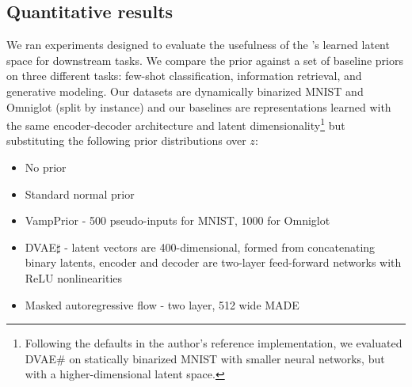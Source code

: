 \subsection{Quantitative results}

We ran experiments designed to
evaluate the usefulness of the \acronym's
learned latent space for downstream tasks. We 
compare the \acronym\;prior
against a set of baseline priors
on three different tasks:
few-shot classification,
information retrieval,
and generative modeling.
Our datasets are
dynamically binarized MNIST and Omniglot 
(split by instance) and
our baselines are representations
learned with the same encoder-decoder
architecture and latent dimensionality\footnote{Following the defaults
in the author's reference implementation, we evaluated
DVAE\# on statically binarized MNIST with smaller neural networks, but
with a higher-dimensional latent space.} but substituting
the following prior distributions over $z$:
\begin{itemize}
    \setlength\itemsep{0.2em}
    \item No prior
    \item Standard normal prior
    \item VampPrior \citep{tomczak2018vae} - 500 pseudo-inputs for MNIST, 1000 for Omniglot
    \item DVAE$\sharp$ \citep{vahdat2018dvae} - latent vectors are 400-dimensional, formed from concatenating binary latents, encoder and decoder are two-layer feed-forward networks with ReLU nonlinearities
    \item Masked autoregressive flow \citep[MAF; ][]{papamakarios2017masked} - two layer, 512 wide MADE
\end{itemize}
